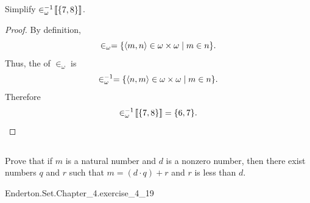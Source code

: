 \documentclass{report}
\begin{document}
\subsection{}%

  Simplify $\in_\omega^{-1}\!\left\llbracket\{7, 8\}\right\rrbracket$.

  \begin{proof}
    By definition,
      $$\in_\omega = \{\left< m, n \right> \in \omega \times \omega \mid m \in n\}.$$
    Thus, the  of $\in_\omega$ is
      $$\in_\omega^{-1} =
        \{\left< n, m \right> \in \omega \times \omega \mid m \in n\}.$$
    Therefore $$\in_\omega^{-1}\!\left\llbracket\{7, 8\}\right\rrbracket = \{6, 7\}.$$
  \end{proof}

\subsection{}%

  Prove that if $m$ is a natural number and $d$ is a nonzero number, then there
    exist numbers $q$ and $r$ such that $m = (d \cdot q) + r$ and $r$ is less
    than $d$.

    {Enderton.Set.Chapter\_4.exercise\_4\_19}
\end{document}
